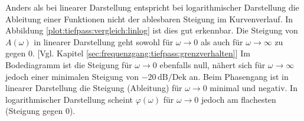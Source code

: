 \begin{frame}
{    %
    Anders als bei linearer Darstellung entspricht bei logarithmischer Darstellung 
    die Ableitung einer Funktionen nicht der ablesbaren Steigung im Kurvenverlauf.
    In Abbildung \ref{plot:tiefpass:vergleich:linlog} ist dies gut erkennbar. 
    Die Steigung von $A(\omega)$ in linearer Darstellung geht sowohl
    für $\omega \to 0$ als auch für $\omega \to \infty$ zu gegen $0$. [Vgl. Kapitel \ref{sec:frequenzgang:tiefpass:grenzverhalten}]
    Im Bodediagramm ist die Steigung für $\omega \to 0$ ebenfalls null, nähert sich für $\omega \to \infty$ 
    jedoch einer minimalen Steigung von $-20\,\mathrm{dB}/\mathrm{Dek}$ an. 
    Beim Phasengang ist in linearer Darstellung die Steigung (Ableitung) für $\omega \to 0$ minimal und negativ.
    In logarithmischer Darstellung scheint $\varphi(\omega)$ für $\omega \to 0$ jedoch am flachesten (Steigung gegen $0$).
}
\end{frame}


